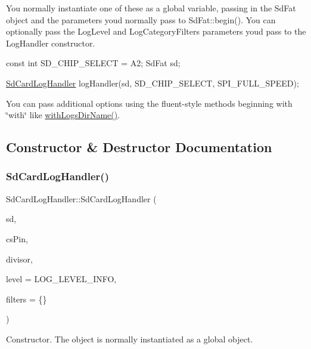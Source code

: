 You normally instantiate one of these as a global variable, passing in the Sd\+Fat object and the parameters you\textquotesingle{}d normally pass to Sd\+Fat\+::begin(). You can optionally pass the Log\+Level and Log\+Category\+Filters parameters you\textquotesingle{}d pass to the Log\+Handler constructor.


\begin{DoxyCode}
\textcolor{keyword}{const} \textcolor{keywordtype}{int} SD\_CHIP\_SELECT = A2;
SdFat sd;

\mbox{\hyperlink{class_sd_card_log_handler}{SdCardLogHandler}} logHandler(sd, SD\_CHIP\_SELECT, SPI\_FULL\_SPEED);
\end{DoxyCode}


You can pass additional options using the fluent-\/style methods beginning with \char`\"{}with\char`\"{} like \mbox{\hyperlink{class_sd_card_log_handler_a6f6d18ab8065c69c1334191defa702f2}{with\+Logs\+Dir\+Name()}}. 

\subsection{Constructor \& Destructor Documentation}
\mbox{\label{class_sd_card_log_handler_a307fc19ae158016fa223b245210a050c}} 
\subsubsection{\texorpdfstring{Sd\+Card\+Log\+Handler()}{SdCardLogHandler()}}
{\footnotesize\ttfamily Sd\+Card\+Log\+Handler\+::\+Sd\+Card\+Log\+Handler (\begin{DoxyParamCaption}\item[{Sd\+Fat \&}]{sd,  }\item[{uint8\+\_\+t}]{cs\+Pin,  }\item[{uint8\+\_\+t}]{divisor,  }\item[{Log\+Level}]{level = {\ttfamily LOG\+\_\+LEVEL\+\_\+INFO},  }\item[{Log\+Category\+Filters}]{filters = {\ttfamily \{\}} }\end{DoxyParamCaption})}



Constructor. The object is normally instantiated as a global object. 


